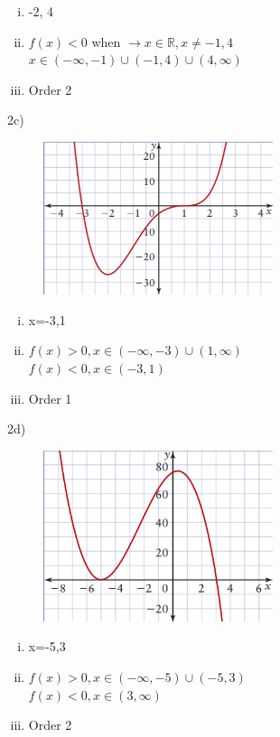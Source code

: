 \documentclass{article}
\begin{document}
\begin{itemize}
\begin{enumerate}[i.]
    \item -2, 4
    \item $f(x)<0$ when $\to x \in \mathbb{R}, x\neq-1,4$  \\ $x\in (-\infty,-1)\cup(-1,4)\cup(4,\infty)$
    \item Order 2
\end{enumerate}
2c)
\begin{figure}[ht]
    \centering
    \includegraphics[width=0.6\textwidth]{imgs/gc.png}
\end{figure}

\begin{enumerate}[i.]
    \item x=-3,1
    \item $f(x)>0, x\in (-\infty,-3)\cup(1,\infty)$\\ $f(x)<0, x\in(-3,1)$
    \item Order 1
\end{enumerate}
2d)
\begin{figure}[ht]
    \centering
    \includegraphics[width=0.6\textwidth]{imgs/gd.png}
\end{figure}

\begin{enumerate}[i.]
    \item x=-5,3
    \item $f(x)>0, x\in (-\infty,-5)\cup(-5,3)$\\ $f(x)<0, x\in(3,\infty)$
    \item Order 2
\end{enumerate}
\newpage


\end{itemize}
\end{document}
